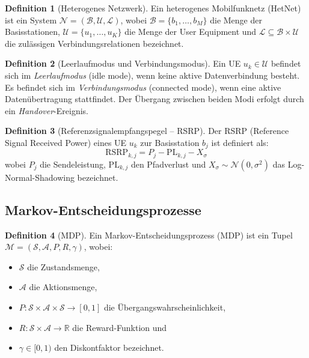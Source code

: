 ﻿\documentclass[a4paper,12pt]{article}
\theoremstyle{definition}
\newtheorem{definition}{Definition}
\begin{document}
\begin{definition}[Heterogenes Netzwerk]
  Ein heterogenes Mobilfunknetz (HetNet) ist ein System
  $\mathcal{N} = (\mathcal{B}, \mathcal{U}, \mathcal{L})$,
  wobei $\mathcal{B} = \{b_1, \ldots, b_M\}$ die Menge der Basisstationen,
  $\mathcal{U} = \{u_1, \ldots, u_K\}$ die Menge der User Equipment und
  $\mathcal{L} \subseteq \mathcal{B} \times \mathcal{U}$ die zulässigen
  Verbindungsrelationen bezeichnet.
\end{definition}

\begin{definition}[Leerlaufmodus und Verbindungsmodus]
  Ein UE $u_k \in \mathcal{U}$ befindet sich im \emph{Leerlaufmodus} (idle mode),
  wenn keine aktive Datenverbindung besteht. Es befindet sich im \emph{Verbindungsmodus}
  (connected mode), wenn eine aktive Datenübertragung stattfindet. Der Übergang zwischen
  beiden Modi erfolgt durch ein \emph{Handover}-Ereignis.
\end{definition}

\begin{definition}[Referenzsignalempfangspegel -- RSRP]
  Der RSRP (Reference Signal Received Power) eines UE $u_k$ zur Basisstation $b_j$ ist
  definiert als:
  \[
    \mathrm{RSRP}_{k,j} = P_j - \mathrm{PL}_{k,j} - X_{\sigma}
  \]
  wobei $P_j$ die Sendeleistung, $\mathrm{PL}_{k,j}$ den Pfadverlust und
  $X_{\sigma} \sim \mathcal{N}(0, \sigma^2)$ das Log-Normal-Shadowing bezeichnet.
\end{definition}

\subsection{Markov-Entscheidungsprozesse}

\begin{definition}[MDP]
  Ein Markov-Entscheidungsprozess (MDP) ist ein Tupel
  $\mathcal{M} = (\mathcal{S}, \mathcal{A}, P, R, \gamma)$, wobei:
  \begin{itemize}
    \item $\mathcal{S}$ die Zustandsmenge,
    \item $\mathcal{A}$ die Aktionsmenge,
    \item $P: \mathcal{S} \times \mathcal{A} \times \mathcal{S} \to [0,1]$ die Übergangswahrscheinlichkeit,
    \item $R: \mathcal{S} \times \mathcal{A} \to \mathbb{R}$ die Reward-Funktion und
    \item $\gamma \in [0,1)$ den Diskontfaktor bezeichnet.
  \end{itemize}
\end{definition}
\end{document}

